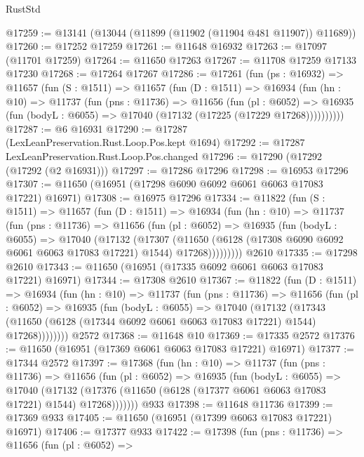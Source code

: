 \begin{lexlean}{RustStd}
\begin{coremodule}
@17259 := @13141 (@13044 (@11899 (@11902 (@11904 @481 @11907)) @11689))
@17260 := @17252 @17259
@17261 := @11648 @16932
@17263 := @17097 (@11701 @17259)
@17264 := @11650 @17263
@17267 := @11708 @17259 @17133 @17230
@17268 := @17264 @17267
@17286 := @17261
    (fun (ps : @16932) =>
    @11657
      (fun (S : @1511) =>
      @11657
        (fun (D : @1511) =>
        @16934
          (fun (hn : @10) =>
          @11737
            (fun (pns : @11736) =>
            @11656
              (fun (pl : @6052) =>
              @16935 (fun (bodyL : @6055) => @17040 (@17132 (@17225 (@17229 @17268))))))))))
@17287 := @6 @16931
@17290 := @17287 (LexLeanPreservation.Rust.Loop.Pos.kept @1694)
@17292 := @17287 LexLeanPreservation.Rust.Loop.Pos.changed
@17296 := @17290 (@17292 (@17292 (@2 @16931)))
@17297 := @17286 @17296
@17298 := @16953 @17296
@17307 := @11650 (@16951 (@17298 @6090 @6092 @6061 @6063 @17083 @17221) @16971)
@17308 := @16975 @17296
@17334 := @11822
    (fun (S : @1511) =>
    @11657
      (fun (D : @1511) =>
      @16934
        (fun (hn : @10) =>
        @11737
          (fun (pns : @11736) =>
          @11656
            (fun (pl : @6052) =>
            @16935
              (fun (bodyL : @6055) =>
              @17040
                (@17132
                  (@17307
                    (@11650
                      (@6128 (@17308 @6090 @6092 @6061 @6063 @17083 @17221) @1544)
                      @17268)))))))))
    @2610
@17335 := @17298 @2610
@17343 := @11650 (@16951 (@17335 @6092 @6061 @6063 @17083 @17221) @16971)
@17344 := @17308 @2610
@17367 := @11822
    (fun (D : @1511) =>
    @16934
      (fun (hn : @10) =>
      @11737
        (fun (pns : @11736) =>
        @11656
          (fun (pl : @6052) =>
          @16935
            (fun (bodyL : @6055) =>
            @17040
              (@17132
                (@17343
                  (@11650 (@6128 (@17344 @6092 @6061 @6063 @17083 @17221) @1544) @17268))))))))
    @2572
@17368 := @11648 @10
@17369 := @17335 @2572
@17376 := @11650 (@16951 (@17369 @6061 @6063 @17083 @17221) @16971)
@17377 := @17344 @2572
@17397 := @17368
    (fun (hn : @10) =>
    @11737
      (fun (pns : @11736) =>
      @11656
        (fun (pl : @6052) =>
        @16935
          (fun (bodyL : @6055) =>
          @17040
            (@17132 (@17376 (@11650 (@6128 (@17377 @6061 @6063 @17083 @17221) @1544) @17268)))))))
    @933
@17398 := @11648 @11736
@17399 := @17369 @933
@17405 := @11650 (@16951 (@17399 @6063 @17083 @17221) @16971)
@17406 := @17377 @933
@17422 := @17398
    (fun (pns : @11736) =>
    @11656
      (fun (pl : @6052) =>

\end{coremodule}
\end{lexlean}
